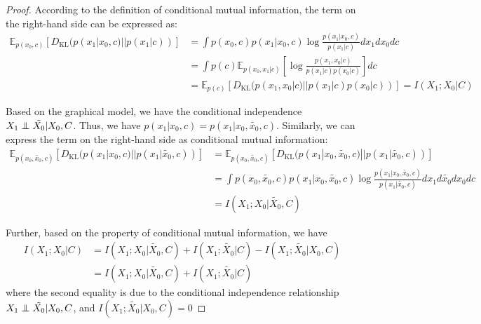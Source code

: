 \begin{proof}
    According to the definition of conditional mutual information, the term on the right-hand side can be expressed as:
    \begin{equation}
    \begin{split}
        \mathbb{E}_{p(x_0, c)}\left[ D_{\text{KL}}(p(x_1|x_0,c)||p(x_1|c)) \right] &= \int p(x_0, c) p(x_1|x_0,c) \log \frac{p(x_1|x_0,c)}{p(x_1|c)} dx_1dx_0dc \nonumber\\
        &= \int p(c) \mathbb{E}_{p(x_0,x_1|c)} \left[ \log \frac{p(x_1,x_0|c)}{p(x_1|c) p(x_0|c)}\right] dc \nonumber\\
        &= \mathbb{E}_{p(c)} \left[ D_{\text{KL}}(p(x_1,x_0|c)||p(x_1|c)p(x_0|c)) \right] = I(X_1;X_0|C)
    \end{split}
    \end{equation}

    Based on the graphical model, we have the conditional independence $X_1 \perp\!\!\!\!\perp \tilde{X_0}|X_0,C$. Thus, we have $p(x_1|x_0,c)=p(x_1|x_0, \tilde{x_0},c)$. Similarly, we can express the term on the right-hand side as conditional mutual information:
    \begin{equation}
        \begin{split}
            \mathbb{E}_{p(x_0, \tilde{x_0}, c)}\left[ D_{\text{KL}}(p(x_1|x_0,c)||p(x_1|\tilde{x_0},c)) \right] &= \mathbb{E}_{p(x_0, \tilde{x_0}, c)}\left[ D_{\text{KL}}(p(x_1|x_0, \tilde{x_0},c)||p(x_1|\tilde{x_0},c)) \right]\nonumber\\
            &= \int p(x_0, \tilde{x_0}, c) p(x_1|x_0,\tilde{x_0},c) \log \frac{p(x_1|x_0, \tilde{x_0},c)}{p(x_1|\tilde{x_0},c)} dx_1d\tilde{x_0}dx_0dc \nonumber\\
            &= I(X_1;X_0|\tilde{X_0},C)
        \end{split}
    \end{equation}

Further, based on the property of conditional mutual information, we have
\begin{equation}
    \begin{split}
    I(X_1;X_0|C)&=I(X_1;X_0|\tilde{X_0},C) + I(X_1;\tilde{X_0}|C) - I(X_1;\tilde{X_0}|X_0,C)\nonumber\\
    &=I(X_1;X_0|\tilde{X_0},C) + I(X_1;\tilde{X_0}|C)
    \end{split}
\end{equation}
where the second equality is due to the conditional independence relationship $X_1 \perp\!\!\!\!\perp \tilde{X_0}|X_0,C$, and $I(X_1;\tilde{X_0}|X_0,C)=0$


\end{proof}
